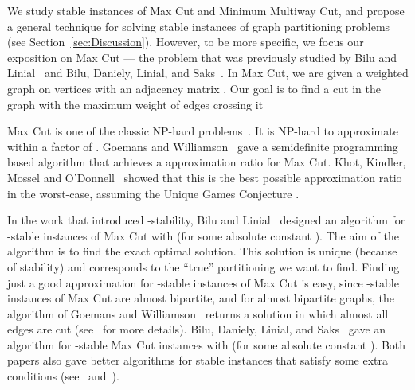 \documentclass[twoside,leqno,twocolumn]{article}
\begin{document}
We study stable instances of Max Cut and Minimum Multiway Cut, and propose a general technique for solving 
stable instances of graph partitioning problems (see Section~\ref{sec:Discussion}). However, to be more specific,
we focus  our exposition on Max Cut --- the problem that was previously studied by Bilu and Linial~\cite{BL} and Bilu, Daniely, Linial, and Saks~\cite{BDLS}.
In Max Cut, we are given a weighted graph  on  vertices with an adjacency matrix . Our goal is to find a cut  in the graph with the maximum weight of edges crossing it

Max Cut is one of the classic NP-hard problems~\cite{GJ}. It is NP-hard to approximate within a factor of  \cite{Hastad,TSSW}.
Goemans and Williamson~\cite{GW} gave a semidefinite programming based algorithm that achieves a  approximation ratio for Max Cut. Khot, Kindler, Mossel and O'Donnell~\cite{KKMO} showed that this is the best possible approximation ratio in the worst-case, assuming the Unique Games Conjecture \cite{Khot}.

In the work that introduced -stability, Bilu and Linial~\cite{BL} designed an algorithm for -stable instances of Max Cut with  (for some absolute constant ). The aim of 
the algorithm is to find the exact optimal solution. This solution is unique (because of stability) and corresponds to the ``true'' partitioning we want to find. Finding just a good approximation for -stable instances of Max Cut is easy, 
since -stable instances of Max Cut are almost bipartite, and for almost bipartite graphs, the algorithm of Goemans and Williamson~\cite{GW} 
returns a solution in which almost all edges are cut (see~\cite{BL} for more details). Bilu, Daniely, Linial, and Saks~\cite{BDLS} gave an algorithm for -stable Max Cut instances with  (for some absolute constant ). Both papers also gave better algorithms for
stable instances that satisfy some extra conditions (see~\cite{BL} and~\cite{BDLS}). 
 
\end{document}
